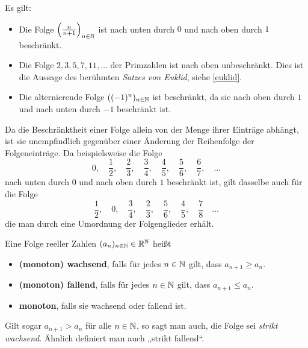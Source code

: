 \begin{bsp} Es gilt:
\begin{itemize}
\item Die Folge $\left(\frac{n}{n+1}\right)_{n\in {\mathbb N}}$ ist nach unten durch $0$ und nach oben durch $1$ beschränkt.
\item Die Folge $2,3,5,7,11,\dots$ der Primzahlen ist nach oben unbeschränkt. Dies ist die Aussage des berühmten \emph{Satzes von Euklid}, siehe \cref{euklid}.
 \item Die alternierende Folge $((-1)^n)_{n\in {\mathbb N}}$ ist beschränkt, da sie nach oben durch $1$ und nach unten durch $-1$ beschränkt ist.
\end{itemize}
\end{bsp}



\begin{bem}
 Da die Beschränktheit einer Folge allein von der Menge ihrer Einträge abhängt, ist sie unempfindlich gegenüber einer Änderung der Reihenfolge der Folgeneinträge. Da beispielsweise die Folge
 \[ 0,\quad\frac{1}{2},\quad\frac{2}{3},\quad\frac{3}{4},\quad\frac{4}{5},\quad\frac{5}{6},\quad\frac{6}{7},\quad\dots \]
 nach unten durch $0$ und nach oben durch $1$ beschränkt ist, gilt dasselbe auch für die Folge
  \[ \frac{1}{2},\quad 0,\quad \frac{3}{4},\quad\frac{2}{3},\quad\frac{5}{6},\quad\frac{4}{5},\quad\frac{7}{8}\quad\dots \]
 die man durch eine Umordnung der Folgenglieder erhält.
\end{bem}


\begin{de}[Monotonie]
  Eine Folge reeller Zahlen $(a_n)_{n\in {\mathbb N}}\in {\mathbb R}^{\mathbb N}$ heißt
  \begin{itemize}
   \item \textbf{(monoton) wachsend}, falls für jedes $n\in {\mathbb N}$ gilt, dass $a_{n+1}\geq a_n$.
   \item \textbf{(monoton) fallend}, falls für jedes $n\in {\mathbb N}$ gilt, dass $a_{n+1}\leq a_n$.
   \item \textbf{monoton}, falls sie wachsend oder fallend ist.
  \end{itemize}
Gilt sogar $a_{n+1}>a_n$ für alle $n\in {\mathbb N}$, so sagt man auch, die Folge sei \emph{strikt wachsend}. Ähnlich definiert man auch „strikt fallend“.
\end{de}




